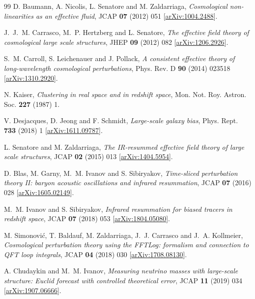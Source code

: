 \documentclass[a4paper,11pt]{article}
\numberwithin{equation}{section}
\begin{document}
\begin{thebibliography}{99}
D. Baumann, A. Nicolis, L. Senatore and M. Zaldarriaga,
\emph{Cosmological non-linearities as an effective fluid},
JCAP \textbf{07} (2012) 051
[\href{https://arxiv.org/abs/1004.2488}{arXiv:1004.2488}].

J.~J.~M. Carrasco, M.~P. Hertzberg and L. Senatore,
\emph{The effective field theory of cosmological large scale structures},
JHEP \textbf{09} (2012) 082
[\href{https://arxiv.org/abs/1206.2926}{arXiv:1206.2926}].

S.~M. Carroll, S. Leichenauer and J. Pollack,
\emph{A consistent effective theory of long-wavelength cosmological perturbations},
Phys. Rev. D \textbf{90} (2014) 023518
[\href{https://arxiv.org/abs/1310.2920}{arXiv:1310.2920}].

N. Kaiser,
\emph{Clustering in real space and in redshift space},
Mon. Not. Roy. Astron. Soc. \textbf{227} (1987) 1.

V. Desjacques, D. Jeong and F. Schmidt,
\emph{Large-scale galaxy bias},
Phys. Rept. \textbf{733} (2018) 1
[\href{https://arxiv.org/abs/1611.09787}{arXiv:1611.09787}].

L. Senatore and M. Zaldarriaga,
\emph{The IR-resummed effective field theory of large scale structures},
JCAP \textbf{02} (2015) 013
[\href{https://arxiv.org/abs/1404.5954}{arXiv:1404.5954}].

D. Blas, M. Garny, M.~M. Ivanov and S. Sibiryakov,
\emph{Time-sliced perturbation theory II: baryon acoustic oscillations and infrared resummation},
JCAP \textbf{07} (2016) 028
[\href{https://arxiv.org/abs/1605.02149}{arXiv:1605.02149}].

M.~M. Ivanov and S. Sibiryakov,
\emph{Infrared resummation for biased tracers in redshift space},
JCAP \textbf{07} (2018) 053
[\href{https://arxiv.org/abs/1804.05080}{arXiv:1804.05080}].

M. Simonovi\'c, T. Baldauf, M. Zaldarriaga, J.~J. Carrasco and J.~A. Kollmeier,
\emph{Cosmological perturbation theory using the FFTLog: formalism and connection to QFT loop integrals},
JCAP \textbf{04} (2018) 030
[\href{https://arxiv.org/abs/1708.08130}{arXiv:1708.08130}].

A. Chudaykin and M.~M. Ivanov,
\emph{Measuring neutrino masses with large-scale structure: Euclid forecast with controlled theoretical error},
JCAP \textbf{11} (2019) 034
[\href{https://arxiv.org/abs/1907.06666}{arXiv:1907.06666}].


\end{thebibliography}
\end{document}
